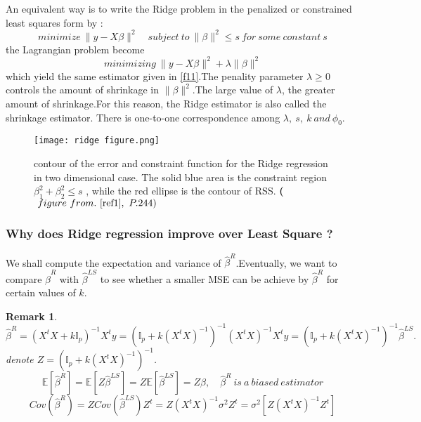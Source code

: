 \documentclass[12pt]{report}
\newtheorem{remarque}{Remark}[section]
\begin{document}
	An equivalent way is to write the Ridge problem in the penalized or constrained least squares form by :
	\begin{equation}
		minimize\  \parallel y- X\beta \parallel^{2}\quad subject\ to\ \parallel \beta \parallel^{2}\leq s\ for\ some\ constant\ s
		\label{u1}
	\end{equation}
	the Lagrangian problem become
	\begin{equation}
		minimizing\ \parallel y- X\beta \parallel^{2}+\lambda\parallel \beta \parallel^{2}
		\label{f12}
	\end{equation} 
	which yield the same estimator given in \eqref{f11}.The penality parameter $\lambda \geq 0$ controls the amount of shrinkage in $\parallel \beta \parallel^{2}$.The large value of $\lambda$, the greater amount of shrinkage.For this reason, the Ridge estimator is also called the shrinkage estimator. There is one-to-one correspondence among $\lambda,\ s,\ k\ and\ \phi_{0}$.
	
	\begin{figure}[h!]
		\begin{center}
			\texttt{[image: ridge figure.png]}
		\end{center}
		\caption[Contour of the error and constraint function for the Ridge regression]{contour of the error and constraint function for the Ridge regression in two dimensional case.
			The solid blue area is the constraint region $\beta_{1}^{2}+ \beta_{2}^{2}\leq s$ , while the red ellipse is the contour of RSS. \textbf{  ($\ figure\ from.\ \cite{ref1},\ P.244) $} } 
		\label{tab2}
	\end{figure}
	\subsubsection{Why does Ridge regression improve over Least Square ?}
	
	We shall compute the expectation and variance of $	\hat{\beta}^{R}$.Eventually, we want to compare $	\hat{\beta}^{R}$ with $	\hat{\beta}^{LS}$ to see whether a smaller MSE can be achieve by $	\hat{\beta}^{R}$ for certain values of $k$.
	\begin{remarque}
		$	\hat{\beta}^{R}=(X^{t}X+k\mathbb{I}_{p})^{-1}X^{t}y=(\mathbb{I}_{p}+k(X^{t}X)^{-1})^{-1}(X^{t}X)^{-1}X^{t}y=(\mathbb{I}_{p}+k(X^{t}X)^{-1})^{-1}\hat{\beta}^{LS}.$
		denote $Z=(\mathbb{I}_{p}+k(X^{t}X)^{-1})^{-1}$.
		\begin{equation}
			\mathbb{E}[\hat{\beta}^{R}]=\mathbb{E}[Z\hat{\beta}^{LS}]=Z\mathbb{E}[\hat{\beta}^{LS}]=Z\beta,\quad \hat{\beta}^{R}\ is\ a\ biased\ estimator 
			\label{f13}
		\end{equation}
		\begin{equation}
			Cov(\hat{\beta}^{R})=ZCov(\hat{\beta}^{LS})Z^{t}=Z(X^{t}X)^{-1}\sigma^{2}Z^{t}=\sigma^{2}[Z(X^{t}X)^{-1}Z^{t}]
			\label{f14}
		\end{equation}
	\end{remarque}
	
\end{document}
